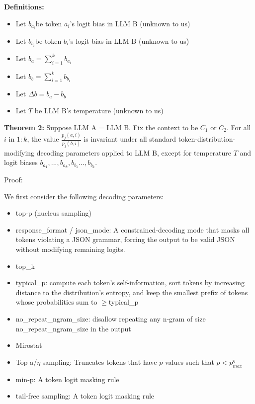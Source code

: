 \documentclass{article}
\begin{document}
\textbf{Definitions:}
\begin{itemize}
\item Let $\displaystyle b_{a_{i}}$be token $\displaystyle a_{i}$'s logit bias in LLM B (unknown to us)
\item Let $\displaystyle b_{b_{i}}$be token $\displaystyle b_{i}$'s logit bias in LLM B (unknown to us)
\item Let $\displaystyle b_{a} =\sum _{i=1}^{k} b_{a_{i}}$
\item Let $\displaystyle b_{b} =\sum _{i=1}^{k} b_{b_{i}}$
\item Let $\displaystyle \Delta b=b_{a} -b_{b}$
\item Let $\displaystyle T$ be LLM B's temperature (unknown to us)
\end{itemize}



\textbf{Theorem 2:} Suppose LLM A = LLM B. Fix the context to be $\displaystyle C_{1}$ or $\displaystyle C_{2}$. For all $\displaystyle i$ in $\displaystyle 1:k$, the value $\displaystyle \frac{p_{j}( a,i)}{p_{j}( b,i)}$ is invariant under all standard token-distribution-modifying decoding parameters applied to LLM B, except for temperature $\displaystyle T$ and logit biases $\displaystyle b_{a_{1}} ,...,b_{a_{k}} ,b_{b_{1}} ...,b_{b_{k}}$.



Proof:

We first consider the following decoding parameters:
\begin{itemize}
\item top-p (nucleus sampling)
\item response\_format / json\_mode: A constrained-decoding mode that masks all tokens violating a JSON grammar, forcing the output to be valid JSON without modifying remaining logits.
\item top\_k
\item typical\_p: compute each token's self-information, sort tokens by increasing distance to the distribution's entropy, and keep the smallest prefix of tokens whose probabilities sum to $\displaystyle \geqslant $typical\_p
\item no\_repeat\_ngram\_size: disallow repeating any n-gram of size no\_repeat\_ngram\_size in the output
\item Mirostat
\item Top-a/$\displaystyle \eta $-sampling: Truncates tokens that have $\displaystyle p$ values such that $\displaystyle p< p_{max}^{\eta }$
\item min-p: A token logit masking rule
\item tail-free sampling: A token logit masking rule
\end{itemize}
\end{document}

